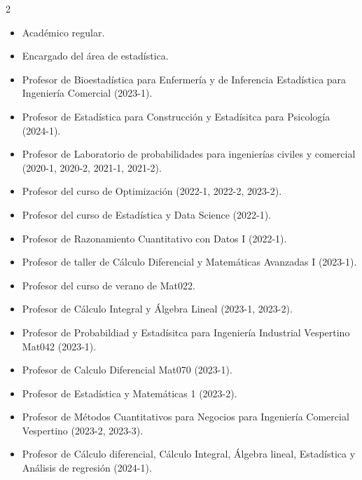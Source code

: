 \documentclass[10pt,letterpaper,ragged2e]{altacv}
\begin{document}
\begin{paracol}{2}


\begin{itemize}
\item Académico regular.
\item Encargado del área de estadística.
\end{itemize}
\begin{itemize}
\item Profesor de Bioestadística para Enfermería y de Inferencia Estadística para Ingeniería Comercial (2023-1).
\item Profesor de Estadística para Construcción y Estadísitca para Psicología (2024-1).
\end{itemize}
\divider
{}
\begin{itemize}
\item Profesor de Laboratorio de probabilidades para ingenierías civiles y comercial (2020-1, 2020-2, 2021-1, 2021-2).
\item Profesor del curso de Optimización (2022-1, 2022-2, 2023-2).
\item Profesor del curso de Estadística y Data Science (2022-1).
\item Profesor de Razonamiento Cuantitativo con Datos I (2022-1).
\item Profesor de taller de Cálculo Diferencial y Matemáticas Avanzadas I (2023-1).
\end{itemize}
\divider
{}
\begin{itemize}
\item Profesor del curso de verano de Mat022.
\item Profesor de Cálculo Integral y Álgebra Lineal (2023-1, 2023-2).
\item Profesor de Probabildiad y Estadísitca para Ingeniería Industrial Vespertino Mat042 (2023-1).
\item Profesor de Calculo Diferencial Mat070 (2023-1).
\item Profesor de Estadística y Matemáticas 1 (2023-2).
\item Profesor de Métodos Cuantitativos para Negocios para Ingeniería Comercial Vespertino (2023-2, 2023-3).
\item Profesor de Cálculo diferencial, Cálculo Integral, Álgebra lineal, Estadística y Análisis de regresión (2024-1).
\end{itemize}




\end{paracol}
\end{document}

